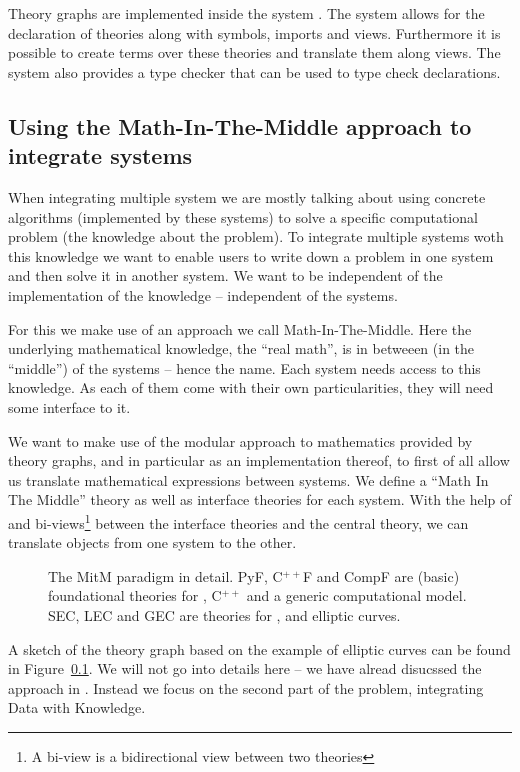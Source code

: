 \documentclass{deliverablereport}
\begin{document}
Theory graphs are implemented inside the \MMT system \cite{RabKoh:WSMSML13}. The system allows for the declaration of theories along with symbols, imports and views. Furthermore it is possible to create terms over these theories and translate them along views. The \MMT system also provides a type checker that can be used to type check declarations.

\subsection{Using the Math-In-The-Middle approach to integrate systems}\label{sec:mitm}

When integrating multiple system we are mostly talking about using concrete algorithms (implemented by these systems) to solve a specific computational problem (the knowledge about the problem). To integrate multiple systems woth this knowledge we want to enable users to write down a problem in one system and then solve it in another system. We want to be independent of the implementation of the knowledge -- independent of the systems.

For this we make use of an approach we call Math-In-The-Middle. Here the underlying mathematical knowledge, the ``real math'', is in betweeen (in the ``middle'') of the systems -- hence the name. Each system needs access to this knowledge. As each of them come with their own particularities, they will need some interface to it.

We want to make use of the modular approach to mathematics provided by theory graphs, and in particular \MMT as an implementation thereof, to first of all allow us translate mathematical expressions between systems. We define a ``Math In The Middle'' theory as well as interface theories for each system. With the help of \MMT and bi-views\footnote{A bi-view is a bidirectional view between two theories} between the interface theories and the central theory, we can translate objects from one system to the other.

\begin{figure}[ht]\centering
  
  \caption{The MitM paradigm in detail. PyF, C${}^{++}$F and CompF are (basic) foundational theories for \python, C${}^{++}$ and a generic computational model. SEC, LEC and GEC are theories for \Sage, \LMFDB and \GAP elliptic curves.}\label{fig:mitm}
\end{figure}

A sketch of the theory graph based on the example of elliptic curves can be found in Figure~\ref{sec:mitm}. We will not go into details here -- we have alread disucssed the approach in \cite{DehKohKon:iop16}. Instead we focus on the second part of the problem, integrating Data with Knowledge.
\end{document}
